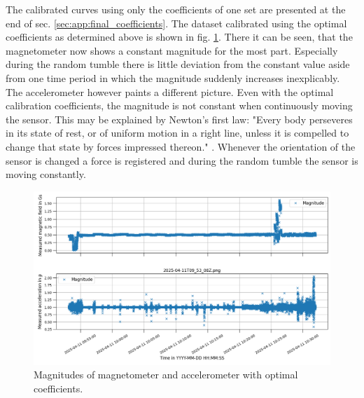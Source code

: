 The calibrated curves using only the coefficients of one set are presented at the end of sec. \ref{sec:app:final_coefficients}. The dataset calibrated using the optimal coefficients as determined above is shown in fig. \ref{fig:res:optimal_coeff_magnitude}. There it can be seen, that the magnetometer now shows a constant magnitude for the most part. Especially during the random tumble there is little deviation from the constant value aside from one time period in which the magnitude suddenly increases inexplicably.\\
The accelerometer however paints a different picture. Even with the optimal calibration coefficients, the magnitude is not constant when continuously moving the sensor. This may be explained by Newton's first law:
"Every body perseveres in its state of rest, or of uniform motion in a right line, unless it is compelled to change that state by forces impressed thereon." \parencite{newton1846}.
Whenever the orientation of the sensor is changed a force is registered and during the random tumble the sensor is moving constantly.

\begin{figure}[H]
    \centering
    \includegraphics[width=\linewidth]{images/04_results/optimal_calibrated_11apr_magnitude.png}
    \caption{Magnitudes of magnetometer and accelerometer with optimal coefficients.}
    \label{fig:res:optimal_coeff_magnitude}
\end{figure}